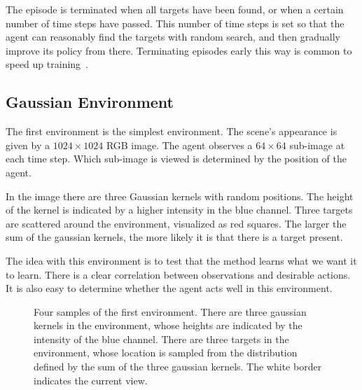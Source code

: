 The episode is terminated when all targets have been found, or when a certain number of time steps have passed.
This number of time steps is set so that the agent can reasonably find the targets with random search, and then gradually improve its policy from there.
Terminating episodes early this way is common to speed up training~\cite{pardo_timelimits_2022}.


\subsection{Gaussian Environment}

The first environment is the simplest environment. 
The scene's appearance is given by a \(1024 \times 1024\) RGB image.
The agent observes a \(64 \times 64\) sub-image at each time step.
Which sub-image is viewed is determined by the position of the agent.

In the image there are three Gaussian kernels with random positions.
The height of the kernel is indicated by a higher intensity in the blue channel.
Three targets are scattered around the environment, visualized as red squares.
The larger the sum of the gaussian kernels, the more likely it is that there is a target present.

The idea with this environment is to test that the method learns what we want it to learn.
There is a clear correlation between observations and desirable actions.
It is also easy to determine whether the agent acts well in this environment.


\begin{figure}
    \centering
    
    \label{fig:gaussian}
    \caption[Gaussian environment]{Four samples of the first environment. There are three gaussian kernels in the environment, whose heights are indicated by the intensity of the blue channel. There are three targets in the environment, whose location is sampled from the distribution defined by the sum of the three gaussian kernels. The white border indicates the current view.}
\end{figure}

